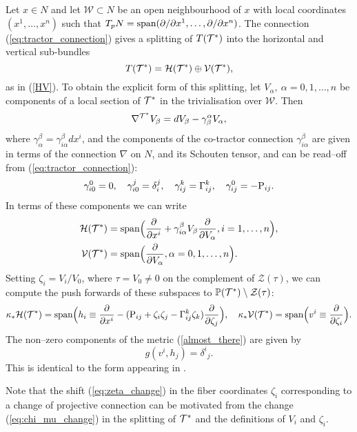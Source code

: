 Let $x\in N$ and let ${\mathcal W}\subset N$ be an open 
neighbourhood of $x$ with 
local coordinates $(x^1, \dots, x^n)$ such that
$T_pN=\mbox{span}(\partial/\partial x^1, \dots, \partial/\partial x^n)$. The connection 
(\ref{eq:tractor_connection}) gives a splitting of $T(\mathcal{T}^*)$ into the horizontal and
vertical sub-bundles
\[
T(\mathcal{T}^*)=\mathcal{H}(\mathcal{T}^*)\oplus \mathcal{V}(\mathcal{T}^*),
\]
as in (\ref{HV}).
To obtain the explicit form of this splitting, let $V_\alpha,\ \alpha=0, 1, \dots, n$ be components of a local section of $\mathcal{T}^*$ in the trivialisation over ${\mathcal{W}}$.
Then
\[
\nabla^{\mathcal{T}^*} V_\beta=d V_\beta-\gamma_{\beta}^{\alpha} V_\alpha,
\]
where $\gamma_{\alpha}^\beta= \gamma_{i\alpha}^\beta dx^i$, and the components
of the co-tractor connection 
$\gamma_{i\alpha}^\beta$  are given in terms of the connection
$\nabla$ on $N$, and its Schouten tensor, and 
can be read--off from (\ref{eq:tractor_connection}):
\[
\gamma_{i0}^0=0, \quad \gamma_{i0}^j=\delta_i^j,\quad
\gamma_{ij}^k=\Gamma_{ij}^k, \quad \gamma_{ij}^0=-\mathrm{P}_{ij}.
\]
In terms of these components we can write
\begin{align*}
\mathcal{H}(\mathcal{T}^*)&=\mbox{span}
\Big( \frac{\partial}{\partial x^i}+ {\gamma_{i\alpha}^\beta} V_\beta
\frac{\partial}{\partial V_{\alpha}}, i=1, \dots, n \Big), \\
 \mathcal{V}(\mathcal{T}^*)&=\mbox{span}\Big(\frac{\partial}{\partial V_{\alpha}}, \alpha=0, 1, 
\dots, n\Big).
\end{align*}
Setting $\zeta_i=V_i/V_0$, where $\tau=V_0\neq 0$ %
on the complement of 
$\mathcal{Z}(\tau)$, 
  we can compute the push forwards
of these subspaces to $\mathbb{P}(\mathcal{T}^*)\setminus {\mathcal{Z}(\tau)}$:
\[
\kappa_* \mathcal{H}(\mathcal{T}^*)=\mbox{span}\Big(h_i\equiv
\frac{\partial}{\partial x^i}-
(\mathrm{P}_{ij}+\zeta_i\zeta_j  -\Gamma_{ij}^k\zeta_k)\frac{\partial}{\partial \zeta_j}
\Big), \quad \kappa_* \mathcal{V}(\mathcal{T}^*)=\mbox{span}\Big(v^i\equiv\frac{\partial}{\partial \zeta_i}
\Big).
\]
The non--zero components of the  metric (\ref{almost_there}) are given by
\[
g(v^i, h_j)={\delta^i}_j.
\]
This is identical to the form appearing in \cite{DM}.
\koniec

\begin{rmk}
Note that the shift (\ref{eq:zeta_change}) in the fiber coordinates $\zeta_{i}$ corresponding to a change of projective connection can be motivated from the change (\ref{eq:chi_mu_change}) in the splitting of $\mathcal{T}^*$ and the definitions of $V_i$ and $\zeta_i$.
\end{rmk}

